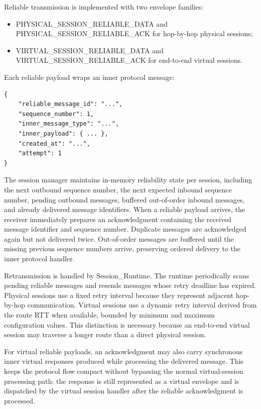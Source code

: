 \documentclass[12pt]{article}
\newcommand{\codebreak}[1]{{\footnotesize\ttfamily #1}}
\begin{document}
Reliable transmission is implemented with two envelope families:

\begin{itemize}
    \item \codebreak{PHYSICAL\_\allowbreak{}SESSION\_\allowbreak{}RELIABLE\_\allowbreak{}DATA} and \codebreak{PHYSICAL\_\allowbreak{}SESSION\_\allowbreak{}RELIABLE\_\allowbreak{}ACK} for hop-by-hop physical sessions;
    \item \codebreak{VIRTUAL\_\allowbreak{}SESSION\_\allowbreak{}RELIABLE\_\allowbreak{}DATA} and \codebreak{VIRTUAL\_\allowbreak{}SESSION\_\allowbreak{}RELIABLE\_\allowbreak{}ACK} for end-to-end virtual sessions.
\end{itemize}

Each reliable payload wraps an inner protocol message:

\begin{verbatim}
{
    "reliable_message_id": "...",
    "sequence_number": 1,
    "inner_message_type": "...",
    "inner_payload": { ... },
    "created_at": "...",
    "attempt": 1
}
\end{verbatim}

The session manager maintains in-memory reliability state per session, including the next outbound sequence number, the next expected inbound sequence number, pending outbound messages, buffered out-of-order inbound messages, and already delivered message identifiers. When a reliable payload arrives, the receiver immediately prepares an acknowledgment containing the received message identifier and sequence number. Duplicate messages are acknowledged again but not delivered twice. Out-of-order messages are buffered until the missing previous sequence numbers arrive, preserving ordered delivery to the inner protocol handler.

Retransmission is handled by \codebreak{Session\_\allowbreak{}Runtime}. The runtime periodically scans pending reliable messages and resends messages whose retry deadline has expired. Physical sessions use a fixed retry interval because they represent adjacent hop-by-hop communication. Virtual sessions use a dynamic retry interval derived from the route RTT when available, bounded by minimum and maximum configuration values. This distinction is necessary because an end-to-end virtual session may traverse a longer route than a direct physical session.

For virtual reliable payloads, an acknowledgment may also carry synchronous inner virtual responses produced while processing the delivered message. This keeps the protocol flow compact without bypassing the normal virtual-session processing path: the response is still represented as a virtual envelope and is dispatched by the virtual session handler after the reliable acknowledgment is processed.
\end{document}
